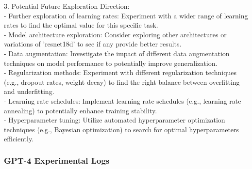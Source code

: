 \documentclass{article}
\begin{document}
\begin{tcolorbox}[enhanced jigsaw,breakable,pad at break*=1mm,
  colback=blue!5!white,colframe=blue!75!black,title=GPT-3.5 Experimental Logs,
  watermark color=white]
3. Potential Future Exploration Direction: \\
   - Further exploration of learning rates: Experiment with a wider range of learning rates to find the optimal value for this specific task. \\
   - Model architecture exploration: Consider exploring other architectures or variations of 'resnet18d' to see if any provide better results. \\
   - Data augmentation: Investigate the impact of different data augmentation techniques on model performance to potentially improve generalization. \\
   - Regularization methods: Experiment with different regularization techniques (e.g., dropout rates, weight decay) to find the right balance between overfitting and underfitting. \\
   - Learning rate schedules: Implement learning rate schedules (e.g., learning rate annealing) to potentially enhance training stability. \\
   - Hyperparameter tuning: Utilize automated hyperparameter optimization techniques (e.g., Bayesian optimization) to search for optimal hyperparameters efficiently. \\
   
\end{tcolorbox}

\subsubsection{GPT-4 Experimental Logs}
\end{document}
